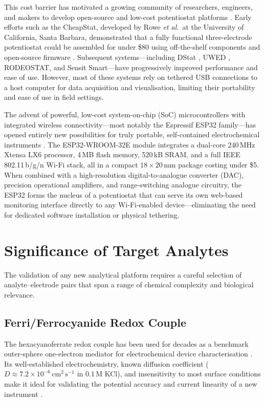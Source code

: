 This cost barrier has motivated a growing community of researchers, engineers, and makers to develop open-source and low-cost potentiostat platforms \cite{Glasscott2020, Dryden2015}. Early efforts such as the CheapStat, developed by Rowe \textit{et al.}\ at the University of California, Santa Barbara, demonstrated that a fully functional three-electrode potentiostat could be assembled for under \$80 using off-the-shelf components and open-source firmware \cite{Rowe2011}. Subsequent systems---including DStat \cite{Dryden2015}, UWED \cite{Ainla2018}, RODEOSTAT, and Sensit Smart---have progressively improved performance and ease of use. However, most of these systems rely on tethered USB connections to a host computer for data acquisition and visualisation, limiting their portability and ease of use in field settings.

The advent of powerful, low-cost system-on-chip (SoC) microcontrollers with integrated wireless connectivity---most notably the Espressif ESP32 family---has opened entirely new possibilities for truly portable, self-contained electrochemical instruments \cite{Esquivel2017, Jenkins2019}. The ESP32-WROOM-32E module integrates a dual-core 240\,MHz Xtensa LX6 processor, 4\,MB flash memory, 520\,kB SRAM, and a full IEEE 802.11\,b/g/n Wi-Fi stack, all in a compact $18\times 20$\,mm package costing under \$5. When combined with a high-resolution digital-to-analogue converter (DAC), precision operational amplifiers, and range-switching analogue circuitry, the ESP32 forms the nucleus of a potentiostat that can serve its own web-based monitoring interface directly to any Wi-Fi-enabled device---eliminating the need for dedicated software installation or physical tethering.

\section{Significance of Target Analytes}
\label{sec:analytes}

The validation of any new analytical platform requires a careful selection of analyte–electrode pairs that span a range of chemical complexity and biological relevance.

\subsection{Ferri/Ferrocyanide Redox Couple}

The hexacyanoferrate redox couple \ferrocene{} has been used for decades as a benchmark outer-sphere one-electron mediator for electrochemical device characterisation \cite{Bard2001}. Its well-established electrochemistry, known diffusion coefficient ($D \approx 7.2 \times 10^{-6}\,\text{cm}^2\,\text{s}^{-1}$ in 0.1\,M KCl), and insensitivity to most surface conditions make it ideal for validating the potential accuracy and current linearity of a new instrument \cite{Konopka1970}.

